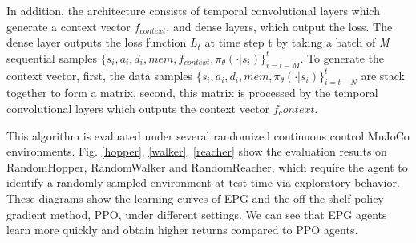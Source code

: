 \par
In addition, the architecture consists of temporal convolutional layers which generate a context vector $f_{context}$, and dense layers, which output the loss. The dense layer outputs the loss function \textit{$L_t$} at time step t by taking a batch of \textit{M} sequential samples $\{{s_i,a_i,d_i},mem,f_{context},\pi_\theta(\cdot|s_i)\}^t_{i=t-M}$. To generate the context vector, first, the data samples $\{{s_i,a_i,d_i},mem,\pi_\theta(\cdot|s_i)\}^t_{i=t-N}$ are stack together to form a matrix, second, this matrix is processed by the temporal convolutional layers which outputs the context vector $f_context$.

\par
This algorithm is evaluated under several randomized continuous control MuJoCo environments. Fig. \ref{hopper}, \ref{walker}, \ref{reacher} show the evaluation results on RandomHopper, RandomWalker and RandomReacher, which require the agent to identify a randomly sampled environment at test time via exploratory behavior. These diagrams show the learning curves of EPG and the off-the-shelf policy gradient method, PPO, under different settings. We can see that EPG agents learn more quickly and obtain higher returns compared to PPO agents.

